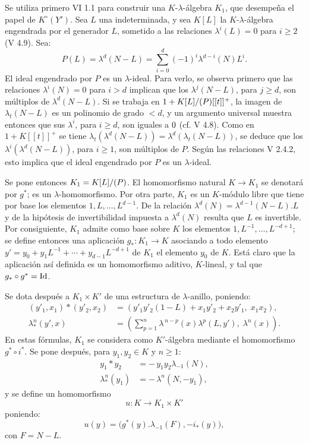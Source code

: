 Se utiliza primero VI 1.1 para construir una \(K\)-\(\lambda\)-álgebra \(K_1\), que desempeña el papel de \(K^\circ(Y')\). Sea \(L\) una indeterminada, y sea \(K[L]\) la \(K\)-\(\lambda\)-álgebra engendrada por el generador \(L\), sometido a las relaciones \(\lambda^i(L)=0\) para \(i\ge2\) (V 4.9). Sea:
\[
  P(L)=\lambda^d(N-L)=\sum_{i=0}^{d}(-1)^i\lambda^{d-i}(N)L^i.
\]
El ideal engendrado por \(P\) es un \(\lambda\)-ideal. Para verlo, se observa primero que las relaciones \(\lambda^i(N)=0\) para \(i>d\) implican que los \(\lambda^j(N-L)\), para \(j\ge d\), son múltiplos de \(\lambda^d(N-L)\). Si se trabaja en \(1+\sisi{K/(P)}{K[L]/(P)}[[t]]^+\), la imagen de \(\lambda_t(N-L)\) es un polinomio de grado \(<d\), y un argumento universal muestra entonces que sus \(\lambda^i\), para \(i\ge d\), son iguales a \(\sisi{1}{0}\) (cf. V 4.8). Como en \(1+K[[t]]^+\) se tiene \(\lambda_t(\lambda^d(N-L))=\lambda^d(\lambda_t(N-L))\), se deduce que los \(\lambda^i(\lambda^d(N-L))\), para \(i\ge1\), son múltiplos de \(P\). Según las relaciones V 2.4.2, esto implica que el ideal engendrado por \(P\) es un \(\lambda\)-ideal.

Se pone entonces \(K_1=\sisi{K/(P)}{K[L]/(P)}\). El homomorfismo natural \(K\to K_1\) se denotará por \(g^*\); es un \(\lambda\)-homomorfismo. Por otra parte, \(K_1\) es un \(K\)-módulo libre que tiene por base los elementos \(1,L,\ldots,L^{d-1}\). De la relación \(\lambda^d(N)=\lambda^{d-1}(N-L).L\) y de la hipótesis de invertibilidad impuesta a \(\lambda^d(N)\) resulta que \(L\) es invertible. Por consiguiente, \(K_1\) admite como base sobre \(K\) los elementos \(1,L^{-1},\ldots,L^{-d+1}\); se define entonces una aplicación \(g_*:K_1\to K\) asociando a todo elemento \(y'=y_0+y_1L^{-1}+\cdots+y_{d-1}L^{-d+1}\) de \(K_1\) el elemento \(y_0\) de \(K\). Está claro que la aplicación así definida es un homomorfismo aditivo, \(K\)-lineal, y tal que \(g_*\circ g^*=\Id\).

Se dota después a \(K_1\times K'\) de una estructura de \(\lambda\)-anillo, poniendo:
\begin{align}
 (y'_1,x_1)*(y'_2,x_2)
   &=(y'_1y'_2(1-L)+x_1y'_2+x_2y'_1,\; x_1x_2), \tag{4.7.1}\\
 \lambda^n_*(y',x)
   &=\left(\sum_{p=1}^{n}\lambda^{\,n-p}(x)\lambda^p(L,y'),\;
     \lambda^n(x)\right). \tag{4.7.2}
\end{align}
En estas fórmulas, \(K_1\) se considera como \(K'\)-álgebra mediante el homomorfismo \(g^*\circ i^*\).
Se pone después, para \(y_1,y_2\in K\) y \(n\ge1\):
\begin{align}
 y_1*y_2&=-\,y_1y_2\lambda_{-1}(N), \tag{4.7.3}\\
 \lambda^n_*(y_1)&=-\,\lambda^n(N,-y_1), \tag{4.7.4}
\end{align}
y se define un homomorfismo
\[
  u:K\longrightarrow K_1\times K'
\]
poniendo:
\[
  u(y)=\bigl(g^*(y).\lambda_{-1}(F),-i_*(y)\bigr),
\]
con \(F=N-L\).

